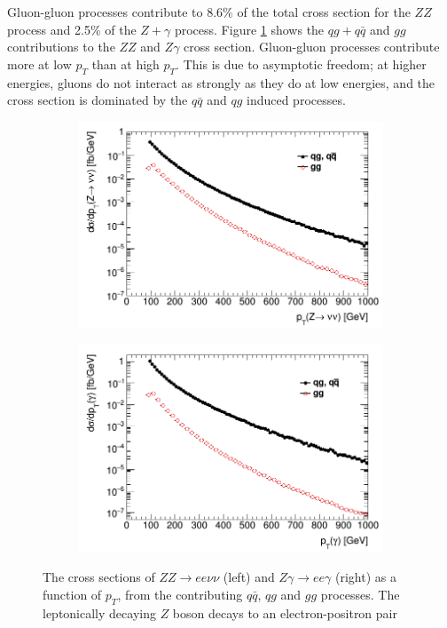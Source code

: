 \documentclass[12pt,a4paper,openright,twoside]{report}
\begin{document}
Gluon-gluon processes contribute to 8.6\% of the total cross section for the $ZZ$ process and 2.5\% of the $Z+\gamma$ process. Figure \ref{fig:xsec_gg_qq} shows the $qg+q\bar{q}$ and $gg$ contributions to the $ZZ$ and $Z\gamma$ cross section. Gluon-gluon processes contribute more at low $p_T$ than at high $p_T$. This is due to asymptotic freedom; at higher energies, gluons do not interact as strongly as they do at low energies, and the cross section is dominated by the $q\bar{q}$ and $qg$ induced processes.

\begin{figure}[H]
\centering
	\begin{subfigure}{0.49\textwidth}
		\includegraphics[width=\linewidth]{ZZ_subproc.png}
	\end{subfigure}
	\begin{subfigure}{0.49\textwidth}
		\includegraphics[width=\linewidth]{Zg_subproc.png}
	\end{subfigure}	
\caption{The cross sections of $ZZ\to ee\nu\nu$ (left) and $Z\gamma\to ee\gamma$ (right) as a function of $p_T$, from the contributing $q\bar{q}$, $qg$ and $gg$ processes. The leptonically decaying $Z$ boson decays to an electron-positron pair}
\label{fig:xsec_gg_qq}
\end{figure}
\end{document}
